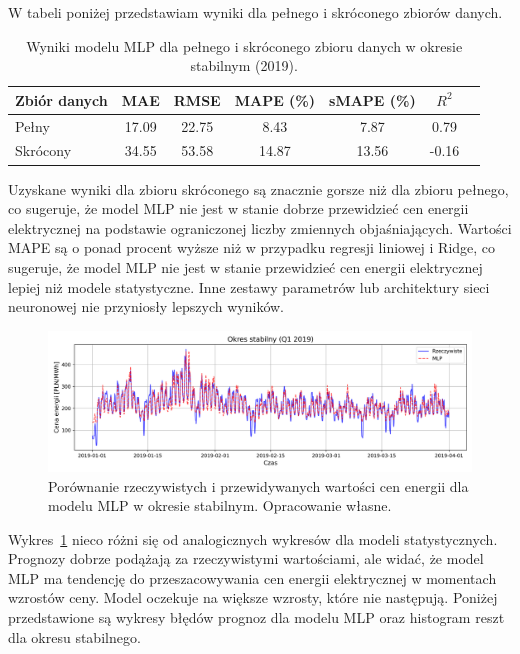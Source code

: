 W tabeli poniżej przedstawiam wyniki dla pełnego i skróconego zbiorów danych. 

\begin{table}[H]
    \centering
    \caption{Wyniki modelu MLP dla pełnego i skróconego zbioru danych w okresie stabilnym (2019).}
    \label{tab:mlp_results_combined_stable}
    \begin{tabular}{|l|cccccc|}
        \hline
        \textbf{Zbiór danych} & \textbf{MAE} & \textbf{RMSE} & \textbf{MAPE (\%)} & \textbf{sMAPE (\%)} & \textbf{\(R^2\)} \\
        \hline
        Pełny     & 17.09 & 22.75 & 8.43 & 7.87 & 0.79 \\
        Skrócony  & 34.55 & 53.58 & 14.87 & 13.56 & -0.16 \\
        \hline
    \end{tabular}
\end{table}

Uzyskane wyniki dla zbioru skróconego są znacznie gorsze niż dla zbioru pełnego, co sugeruje, że model MLP nie jest w stanie dobrze przewidzieć cen energii elektrycznej na podstawie ograniczonej liczby zmiennych objaśniających. Wartości MAPE są o ponad procent wyższe niż w przypadku regresji liniowej i Ridge, co sugeruje, że model MLP nie jest w stanie przewidzieć cen energii elektrycznej lepiej niż modele statystyczne. Inne zestawy parametrów lub architektury sieci neuronowej nie przyniosły lepszych wyników.

\begin{figure}[H]
    \centering
    \includegraphics[width=1.0\textwidth]{../../plots/mlp1/mlp_predictions_full_stable_q1_(64, 64, 32, 16, 8).png}
    \caption{Porównanie rzeczywistych i przewidywanych wartości cen energii dla modelu MLP w okresie stabilnym. Opracowanie własne.}
    \label{fig:mlp_predictions_stable_period}
\end{figure}

Wykres~\ref{fig:mlp_predictions_stable_period} nieco różni się od analogicznych wykresów dla modeli statystycznych. Prognozy dobrze podążają za rzeczywistymi wartościami, ale widać, że model MLP ma tendencję do przeszacowywania cen energii elektrycznej w momentach wzrostów ceny. Model oczekuje na większe wzrosty, które nie następują.\newline
Poniżej przedstawione są wykresy błędów prognoz dla modelu MLP oraz histogram reszt dla okresu stabilnego. 

